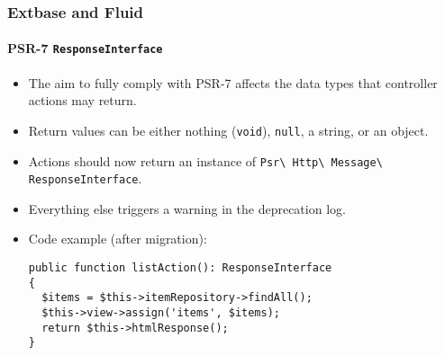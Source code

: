 %

\begin{frame}[fragile]
	\frametitle{Extbase and Fluid}
	\framesubtitle{PSR-7 \texttt{ResponseInterface}}


	\begin{itemize}
		\item The aim to fully comply with PSR-7 affects the data types that
			controller actions may return.
		\item Return values can be either nothing (\small\texttt{void}\normalsize),
			\small\texttt{null}\normalsize, a string, or an object.
		\item Actions should now return an instance of
			\smaller\texttt{Psr\textbackslash
				Http\textbackslash
				Message\textbackslash
				ResponseInterface}.\normalsize
		\item Everything else triggers a warning in the deprecation log.
		\item Code example (after migration):
\begin{lstlisting}
public function listAction(): ResponseInterface
{
  $items = $this->itemRepository->findAll();
  $this->view->assign('items', $items);
  return $this->htmlResponse();
}
\end{lstlisting}

	\end{itemize}

\end{frame}

